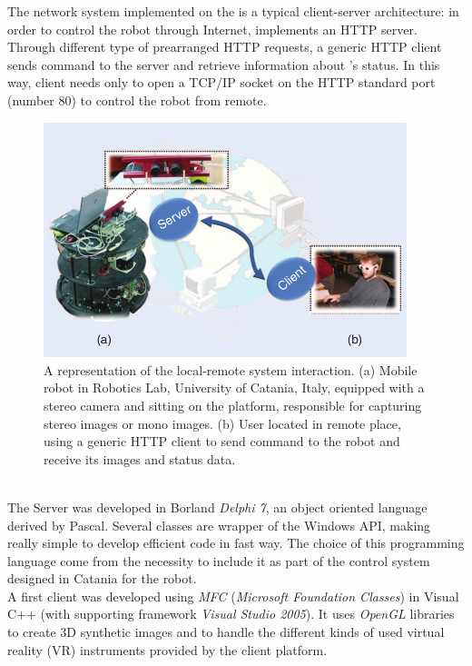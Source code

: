 The network system implemented on the \morduc{} is a typical
client-server architecture: in order to control the robot through
Internet, \morduc{} implements an HTTP server.
\\
Through different type of prearranged HTTP requests, a generic
HTTP client sends command to the server and retrieve information
about \morduc{}'s status. In this way, client needs only to open a TCP/IP
socket on the HTTP standard port (number 80) to control the robot from
remote.
\begin{figure}[h]
  \begin{center}
    \includegraphics[width=300pt]{img/3morduc_client_server.png}
    \caption{A representation of the local-remote system
      interaction. (a) Mobile robot in Robotics Lab, University of
      Catania, Italy, equipped with a stereo camera and sitting on
      the platform, responsible for capturing stereo images or mono
      images. (b) User located in remote place, using a generic HTTP
      client to send command to the robot and receive its images
      and status data.
    }
    \label{fig:3morduc_client_server}
    \end{center}
\end{figure}
\\
The Server was developed in Borland \textit{Delphi 7}, an object oriented
language
derived by Pascal. Several classes are wrapper of the Windows API, making
really simple to develop efficient code in fast way. The choice of this
programming language come from the necessity to include it as part of the
control system designed in Catania for the \morduc{} robot.
\\
A first client was developed using \textit{MFC} (\textit{Microsoft Foundation
Classes}) in Visual C++ (with supporting framework \textit{Visual Studio 2005}).
It uses \textit{OpenGL} libraries to create 3D synthetic images and to handle
the different kinds of used virtual reality (VR) instruments provided by the client platform.
